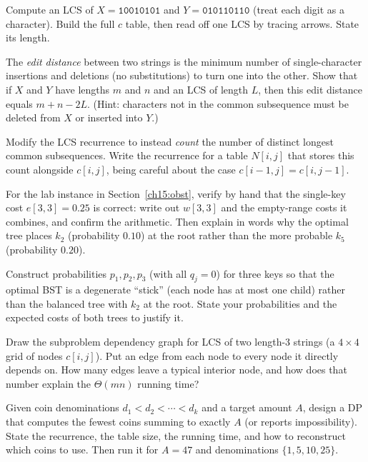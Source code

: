 \begin{exercise}
\label{ch15:ex-lcs}
Compute an LCS of $X = \texttt{10010101}$ and $Y = \texttt{010110110}$ (treat
each digit as a character). Build the full $c$ table, then read off one LCS by
tracing arrows. State its length.
\end{exercise}

\begin{exercise}
\label{ch15:ex-edit}
The \emph{edit distance} between two strings is the minimum number of
single-character insertions and deletions (no substitutions) to turn one into
the other. Show that if $X$ and $Y$ have lengths $m$ and $n$ and an LCS of
length $L$, then this edit distance equals $m + n - 2L$. (Hint: characters not
in the common subsequence must be deleted from $X$ or inserted into $Y$.)
\end{exercise}

\begin{exercise}
\label{ch15:ex-count}
Modify the LCS recurrence to instead \emph{count} the number of distinct
longest common subsequences. Write the recurrence for a table $N[i,j]$ that
stores this count alongside $c[i,j]$, being careful about the case
$c[i-1,j] = c[i,j-1]$.
\end{exercise}

\begin{exercise}
\label{ch15:ex-obst}
For the lab instance in Section~\ref{ch15:obst}, verify by hand that the
single-key cost $e[3,3] = 0.25$ is correct: write out $w[3,3]$ and the empty-range
costs it combines, and confirm the arithmetic. Then explain in words why the
optimal tree places $k_2$ (probability $0.10$) at the root rather than the more
probable $k_5$ (probability $0.20$).
\end{exercise}

\begin{exercise}
\label{ch15:ex-balanced}
Construct probabilities $p_1, p_2, p_3$ (with all $q_j = 0$) for three keys so
that the optimal BST is a degenerate ``stick'' (each node has at most one child)
rather than the balanced tree with $k_2$ at the root. State your probabilities
and the expected costs of both trees to justify it.
\end{exercise}

\begin{exercise}
\label{ch15:ex-graph}
Draw the subproblem dependency graph for LCS of two length-3 strings (a
$4 \times 4$ grid of nodes $c[i,j]$). Put an edge from each node to every node
it directly depends on. How many edges leave a typical interior node, and how
does that number explain the $\Theta(mn)$ running time?
\end{exercise}

\begin{exercise}
\label{ch15:ex-coins}
Given coin denominations $d_1 < d_2 < \cdots < d_k$ and a target amount $A$,
design a DP that computes the fewest coins summing to exactly $A$ (or reports
impossibility). State the recurrence, the table size, the running time, and how
to reconstruct which coins to use. Then run it for $A = 47$ and denominations
$\{1, 5, 10, 25\}$.
\end{exercise}
